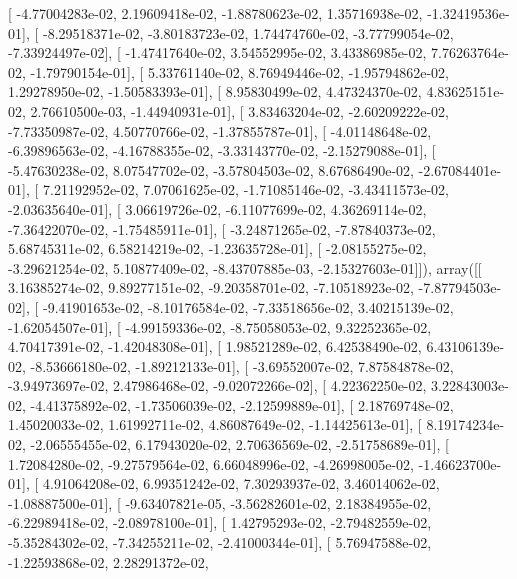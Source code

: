\documentclass{article}
\begin{document}
       [ -4.77004283e-02,   2.19609418e-02,  -1.88780623e-02,
          1.35716938e-02,  -1.32419536e-01],
       [ -8.29518371e-02,  -3.80183723e-02,   1.74474760e-02,
         -3.77799054e-02,  -7.33924497e-02],
       [ -1.47417640e-02,   3.54552995e-02,   3.43386985e-02,
          7.76263764e-02,  -1.79790154e-01],
       [  5.33761140e-02,   8.76949446e-02,  -1.95794862e-02,
          1.29278950e-02,  -1.50583393e-01],
       [  8.95830499e-02,   4.47324370e-02,   4.83625151e-02,
          2.76610500e-03,  -1.44940931e-01],
       [  3.83463204e-02,  -2.60209222e-02,  -7.73350987e-02,
          4.50770766e-02,  -1.37855787e-01],
       [ -4.01148648e-02,  -6.39896563e-02,  -4.16788355e-02,
         -3.33143770e-02,  -2.15279088e-01],
       [ -5.47630238e-02,   8.07547702e-02,  -3.57804503e-02,
          8.67686490e-02,  -2.67084401e-01],
       [  7.21192952e-02,   7.07061625e-02,  -1.71085146e-02,
         -3.43411573e-02,  -2.03635640e-01],
       [  3.06619726e-02,  -6.11077699e-02,   4.36269114e-02,
         -7.36422070e-02,  -1.75485911e-01],
       [ -3.24871265e-02,  -7.87840373e-02,   5.68745311e-02,
          6.58214219e-02,  -1.23635728e-01],
       [ -2.08155275e-02,  -3.29621254e-02,   5.10877409e-02,
         -8.43707885e-03,  -2.15327603e-01]]), array([[  3.16385274e-02,   9.89277151e-02,  -9.20358701e-02,
         -7.10518923e-02,  -7.87794503e-02],
       [ -9.41901653e-02,  -8.10176584e-02,  -7.33518656e-02,
          3.40215139e-02,  -1.62054507e-01],
       [ -4.99159336e-02,  -8.75058053e-02,   9.32252365e-02,
          4.70417391e-02,  -1.42048308e-01],
       [  1.98521289e-02,   6.42538490e-02,   6.43106139e-02,
         -8.53666180e-02,  -1.89212133e-01],
       [ -3.69552007e-02,   7.87584878e-02,  -3.94973697e-02,
          2.47986468e-02,  -9.02072266e-02],
       [  4.22362250e-02,   3.22843003e-02,  -4.41375892e-02,
         -1.73506039e-02,  -2.12599889e-01],
       [  2.18769748e-02,   1.45020033e-02,   1.61992711e-02,
          4.86087649e-02,  -1.14425613e-01],
       [  8.19174234e-02,  -2.06555455e-02,   6.17943020e-02,
          2.70636569e-02,  -2.51758689e-01],
       [  1.72084280e-02,  -9.27579564e-02,   6.66048996e-02,
         -4.26998005e-02,  -1.46623700e-01],
       [  4.91064208e-02,   6.99351242e-02,   7.30293937e-02,
          3.46014062e-02,  -1.08887500e-01],
       [ -9.63407821e-05,  -3.56282601e-02,   2.18384955e-02,
         -6.22989418e-02,  -2.08978100e-01],
       [  1.42795293e-02,  -2.79482559e-02,  -5.35284302e-02,
         -7.34255211e-02,  -2.41000344e-01],
       [  5.76947588e-02,  -1.22593868e-02,   2.28291372e-02,
\end{document}

